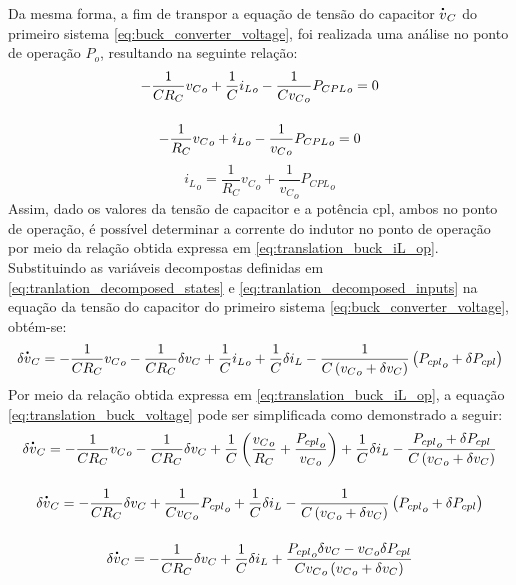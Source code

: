 Da mesma forma, a fim de transpor a equação de tensão do capacitor $\dt{v}_C$ do primeiro sistema \eqref{eq:buck_converter_voltage}, foi realizada uma análise no ponto de operação $P_o$, resultando na seguinte relação: \begin{gather}
  - \frac{1}{C R_C} {v_C}_o + \frac{1}{C} {i_L}_o - \frac{1}{C {v_C}_o} {P_{CPL}}_o = 0 \notag \\[12pt]
  - \frac{1}{R_C} {v_C}_o + {i_L}_o - \frac{1}{{v_C}_o} {P_{CPL}}_o = 0 \notag
\end{gather} \begin{equation}{i_L}_o = \frac{1}{R_C} {v_C}_o + \frac{1}{{v_C}_o} {P_{CPL}}_o \label{eq:translation_buck_iL_op}\end{equation} Assim, dado os valores da tensão de capacitor e a potência \acrshort{cpl}, ambos no ponto de operação, é possível determinar a corrente do indutor no ponto de operação por meio da relação obtida expressa em \eqref{eq:translation_buck_iL_op}. Substituindo as variáveis decompostas definidas em \eqref{eq:tranlation_decomposed_states} e \eqref{eq:tranlation_decomposed_inputs} na equação da tensão do capacitor do primeiro sistema \eqref{eq:buck_converter_voltage}, obtém-se: \begin{equation}
  \delta \dt{v}_C = - \frac{1}{C R_C} {v_C}_o - \frac{1}{C R_C} \delta v_C + \frac{1}{C} {i_L}_o + \frac{1}{C}  \delta i_L - \frac{1}{C \left({v_C}_o + \delta v_C\right)} \left({P_{cpl}}_o + \delta P_{cpl}\right) \label{eq:translation_buck_voltage}
\end{equation} Por meio da relação obtida expressa em \eqref{eq:translation_buck_iL_op}, a equação \eqref{eq:translation_buck_voltage} pode ser simplificada como demonstrado a seguir: \begin{gather}
  \delta \dt{v}_C = - \frac{1}{C R_C} {v_C}_o - \frac{1}{C R_C} \delta v_C + \frac{1}{C} \left(\frac{{v_C}_o}{R_C} + \frac{{P_{cpl}}_o}{{v_C}_o}\right) + \frac{1}{C}  \delta i_L - \frac{{P_{cpl}}_o + \delta P_{cpl}}{C \left({v_C}_o + \delta v_C\right)} \notag \\[12pt]  
  \delta \dt{v}_C = - \frac{1}{C R_C} \delta v_C + \frac{1}{C {v_C}_o} {P_{cpl}}_o + \frac{1}{C}  \delta i_L - \frac{1}{C \left({v_C}_o + \delta v_C\right)} \left({P_{cpl}}_o + \delta P_{cpl}\right) \notag \\[12pt]
  \delta \dt{v}_C = - \frac{1}{C R_C} \delta v_C  + \frac{1}{C}  \delta i_L + \frac{{P_{cpl}}_o \delta v_C - {v_C}_o \delta P_{cpl}}{C {v_C}_o \left({v_C}_o + \delta v_C\right)}
\end{gather}

